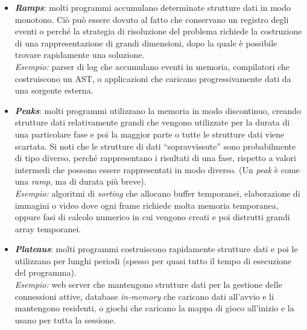 \begin{itemize}
  \item \textbf{\textit{Ramps}}: molti programmi accumulano determinate strutture dati in modo monotono. Ciò può essere dovuto al fatto che conservano un registro degli eventi o perché la strategia di risoluzione del problema richiede la costruzione di una rappresentazione di grandi dimensioni, dopo la quale è possibile trovare rapidamente una soluzione.\\
  \textit{Esempio:} parser di log che accumulano eventi in memoria, compilatori che costruiscono un AST, o applicazioni che caricano progressivamente dati da una sorgente esterna.

  \item \textbf{\textit{Peaks}}: molti programmi utilizzano la memoria in modo discontinuo, creando strutture dati relativamente grandi che vengono utilizzate per la durata di una particolare fase e poi la maggior parte o tutte le strutture dati viene scartata. Si noti che le strutture di dati “sopravvissute” sono probabilmente di tipo diverso, perché rappresentano i risultati di una fase, rispetto a valori intermedi che possono essere rappresentati in modo diverso. (Un \textit{peak} è come una \textit{ramp}, ma di durata più breve).\\
  \textit{Esempio:} algoritmi di \textit{sorting} che allocano buffer temporanei, elaborazione di immagini o video dove ogni frame richiede molta memoria temporanea, oppure fasi di calcolo numerico in cui vengono creati e poi distrutti grandi array temporanei.

  \item \textbf{\textit{Plateaus}}: molti programmi costruiscono rapidamente strutture dati e poi le utilizzano per lunghi periodi (spesso per quasi tutto il tempo di esecuzione del programma).\\
  \textit{Esempio:} web server che mantengono strutture dati per la gestione delle connessioni attive, database \textit{in-memory} che caricano dati all’avvio e li mantengono residenti, o giochi che caricano la mappa di gioco all’inizio e la usano per tutta la sessione.
\end{itemize}



